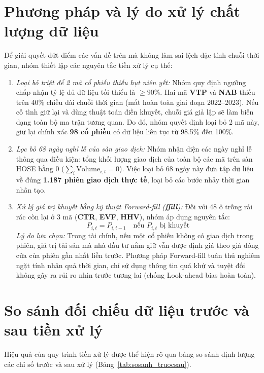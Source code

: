 \documentclass[12pt,a4paper,oneside,openany]{report}
\begin{document}
\section{Phương pháp và lý do xử lý chất lượng dữ liệu}
Để giải quyết dứt điểm các vấn đề trên mà không làm sai lệch đặc tính chuỗi thời gian, nhóm thiết lập các nguyên tắc tiền xử lý cụ thể:
\begin{enumerate}
  \item \textit{Loại bỏ triệt để 2 mã cổ phiếu thiếu hụt niên yết:} 
  Nhóm quy định ngưỡng chấp nhận tỷ lệ đủ dữ liệu tối thiểu là $\ge 90\%$. Hai mã \textbf{VTP} và \textbf{NAB} thiếu trên 40\% chiều dài chuỗi thời gian (mất hoàn toàn giai đoạn 2022--2023). Nếu cố tình giữ lại và dùng thuật toán điền khuyết, chuỗi giá giả lập sẽ làm biến dạng toàn bộ ma trận tương quan. Do đó, nhóm quyết định loại bỏ 2 mã này, giữ lại chính xác \textbf{98 cổ phiếu} có dữ liệu liên tục từ 98.5\% đến 100\%.
  \item \textit{Lọc bỏ 68 ngày nghỉ lễ của sàn giao dịch:}
  Nhóm nhận diện các ngày nghỉ lễ thông qua điều kiện: tổng khối lượng giao dịch của toàn bộ các mã trên sàn HOSE bằng 0 ($\sum_i \text{Volume}_{i, t} = 0$). Việc loại bỏ 68 ngày này đưa tập dữ liệu về đúng \textbf{1.187 phiên giao dịch thực tế}, loại bỏ các bước nhảy thời gian nhân tạo.
  \item \textit{Xử lý giá trị khuyết bằng kỹ thuật Forward-fill (\textbf{ffill}):}
  Đối với 48 ô trống rải rác còn lại ở 3 mã (\textbf{CTR}, \textbf{EVF}, \textbf{HHV}), nhóm áp dụng nguyên tắc:
  \begin{equation}
    P_{i, t} = P_{i, t-1} \quad \text{nếu } P_{i, t} \text{ bị khuyết}
  \end{equation}
  \textit{Lý do lựa chọn:} Trong tài chính, nếu một cổ phiếu không có giao dịch trong phiên, giá trị tài sản mà nhà đầu tư nắm giữ vẫn được định giá theo giá đóng cửa của phiên gần nhất liền trước. Phương pháp Forward-fill tuân thủ nghiêm ngặt tính nhân quả thời gian, chỉ sử dụng thông tin quá khứ và tuyệt đối không gây ra rủi ro nhìn trước tương lai (chống Look-ahead bias hoàn toàn).
\end{enumerate}

\section{So sánh đối chiếu dữ liệu trước và sau tiền xử lý}
Hiệu quả của quy trình tiền xử lý được thể hiện rõ qua bảng so sánh định lượng các chỉ số trước và sau xử lý (Bảng~\ref{tab:sosanh_truocsau}).
\end{document}
